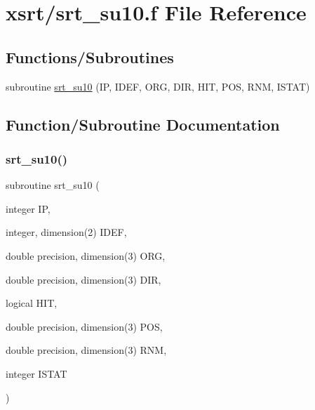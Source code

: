 \hypertarget{srt__su10_8f}{}\section{xsrt/srt\+\_\+su10.f File Reference}
\label{srt__su10_8f}
\subsection*{Functions/\+Subroutines}
\begin{DoxyCompactItemize}
\item 
subroutine \hyperlink{srt__su10_8f_a6169d31dc1c8711449c9a1e9eebdd7ea}{srt\+\_\+su10} (IP, I\+D\+EF, O\+RG, D\+IR, H\+IT, P\+OS, R\+NM, I\+S\+T\+AT)
\end{DoxyCompactItemize}


\subsection{Function/\+Subroutine Documentation}
\mbox{\label{srt__su10_8f_a6169d31dc1c8711449c9a1e9eebdd7ea}} 
\subsubsection{\texorpdfstring{srt\+\_\+su10()}{srt\_su10()}}
{\footnotesize\ttfamily subroutine srt\+\_\+su10 (\begin{DoxyParamCaption}\item[{integer}]{IP,  }\item[{integer, dimension(2)}]{I\+D\+EF,  }\item[{double precision, dimension(3)}]{O\+RG,  }\item[{double precision, dimension(3)}]{D\+IR,  }\item[{logical}]{H\+IT,  }\item[{double precision, dimension(3)}]{P\+OS,  }\item[{double precision, dimension(3)}]{R\+NM,  }\item[{integer}]{I\+S\+T\+AT }\end{DoxyParamCaption})}

